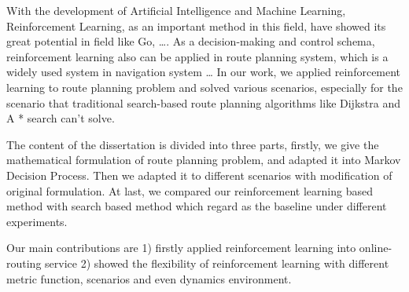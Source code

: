 \documentclass{standalone}
\begin{document}
\begin{englishabstract}
    With the development of Artificial Intelligence and Machine Learning, Reinforcement Learning, as an important method in this field, have showed its great potential in field like Go, …. As a decision-making and control schema, reinforcement learning also can be applied in route planning system, which is a widely used system in navigation system … In our work, we applied reinforcement learning to route planning problem and solved various scenarios, especially for the scenario that traditional search-based route planning algorithms like Dijkstra and A * search can’t solve. 
    
    The content of the dissertation is divided into three parts, firstly, we give the mathematical formulation of route planning problem, and adapted it into Markov Decision Process. Then we adapted it to different scenarios with modification of original formulation. At last, we compared our reinforcement learning based method with search based method which regard as the baseline under different experiments.
    
    Our main contributions are 1) firstly applied reinforcement learning into online-routing service 2) showed the flexibility of reinforcement learning with different metric function, scenarios and even dynamics environment.

	
\end{englishabstract}
\end{document}
